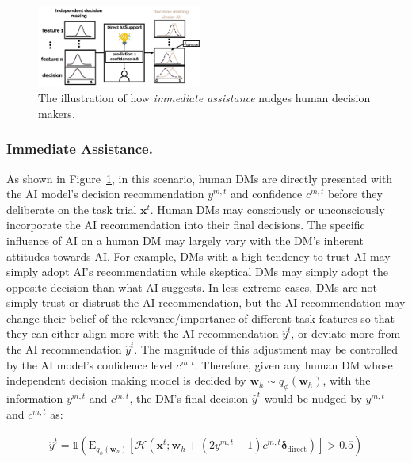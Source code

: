\documentclass[letterpaper]{article} %
\begin{document}
\begin{figure}[t]
    \centering
        \includegraphics[width=0.48\textwidth]{figures/direct_ai_support.png}
    \caption{The illustration of how \emph{immediate assistance} nudges human decision makers.}
    \label{fig:ill_direct}
\end{figure}


\subsubsection{Immediate Assistance.}
As shown in Figure~\ref{fig:ill_direct}, in this scenario, human DMs are directly presented with the AI model's decision recommendation $y^{m,t}$ and confidence $c^{m,t}$ before they deliberate on the task trial $\bm{x}^t$. Human DMs may consciously or unconsciously incorporate the AI recommendation into their final decisions. The specific influence of AI on a human DM may largely vary with the DM's inherent attitudes towards AI.  %
For example, DMs with a high tendency to trust AI may simply adopt AI's recommendation while skeptical DMs may simply adopt the opposite decision than what AI suggests. 
In less extreme cases, DMs are not simply trust or distrust the AI recommendation, 
but the AI recommendation may change their belief of the relevance/importance of different task features so that they can either align more with the AI recommendation $\hat{y}^{t}$, or deviate more from the AI recommendation  $\hat{y}^{t}$. The magnitude of this adjustment may be controlled by the AI model's confidence level $c^{m,t}$.
Therefore, given any human DM whose independent decision making model is decided by $\bm{w}_h \sim q_{\phi}(\bm{w}_h)$, with the information $y^{m,t}$ and $c^{m,t}$, the DM's final decision $\hat{y}^{t}$ would be nudged by $y^{m,t}$  and $c^{m,t}$ as:
\begin{small}
\begin{equation}
\begin{split}
      \hat{y}^{t} =
    \mathds{1}(\mathrm{E}_{q_{\phi}(\bm{w}_h)} [\mathcal{H}(\bm{x}^t;\bm{w}_h + (2y^{m,t} -1)c^{m,t}\bm{\delta}_{\text{direct}})]>0.5)
\end{split}
\end{equation}
\end{small}
\end{document}
